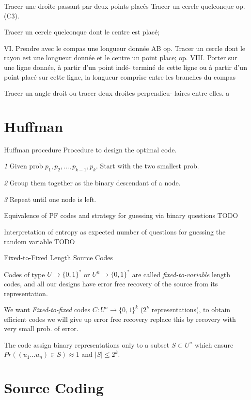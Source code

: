 \documentclass[12pt,a4paper,oneside]{article} %
\newcommand{\concept}[1]{\textcolor{rtLightBlue900}{#1}}
\newcommand{\subconcept}[1]{\textcolor{rtLightBlue900}{\textit{#1}}}
\begin{document}
Tracer une droite passant par deux points placés 
Tracer un cercle quelconque op. (C3).

Tracer un cercle quelconque dont le centre est placé;

VI. Prendre avec le compas une longueur donnée AB
op.
Tracer un cercle dont le rayon est une longueur donnée
et le centre un point place; op. 
VIII. Porter sur une ligne donnée, à partir d'un point indé-
terminé de cette ligne ou à partir d'un point placé
sur cette ligne, la longueur comprise entre les branches du compas

Tracer un angle droit ou tracer deux droites perpendicu-
laires entre elles.
a


\section{Huffman}

\concept{Huffman procedure} 
Procedure to design the optimal code.

\subconcept{1} Given prob $p_1,p_2,...,p_{k-1},p_k$. Start with the two smallest prob.

\subconcept{2} Group them together as the binary descendant of a node.

\subconcept{3} Repeat until one node is left.

\concept{Equivalence of PF codes and strategy for guessing via binary questions} TODO

\concept{Interpretation of entropy as expected number of questions for guessing the random variable} TODO





\concept{Fixed-to-Fixed Length Source Codes} 

Codes of type $U\to \{0,1\}^*$ or $U^n \to \{0,1\}^*$ are called \subconcept{fixed-to-variable} length codes, and all our designs have error free recovery of the source from its representation.


We want \subconcept{Fixed-to-fixed} codes $C:U^n \to \{0,1\}^k$ ($2^k$ representations), to obtain efficient codes we will give up error free recovery replace this by recovery with very small prob. of error.


The code assign binary representations only to a subset $S \subset U^n$ which ensure $Pr((u_1...u_n)\in S) \approx 1$ and $|S|\le 2^k$.



\section{Source Coding}
\end{document}
